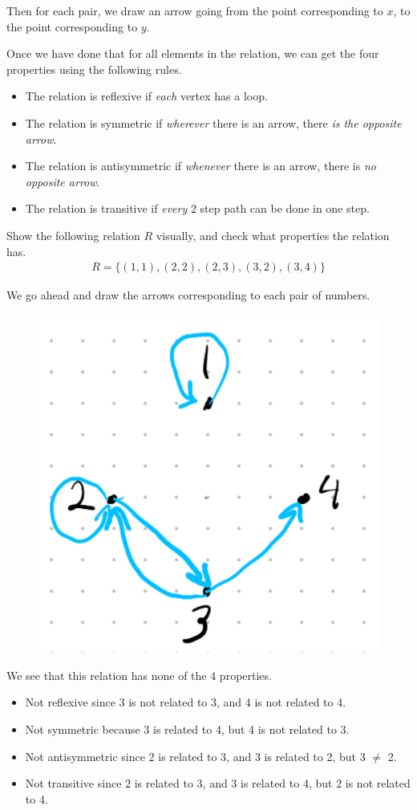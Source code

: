\documentclass[12pt,letterpaper]{article} \usepackage{amsmath} \usepackage{graphicx}  \usepackage{longtable}  \usepackage{amssymb}
\begin{document}
        Then for each pair, we draw an arrow going from the point corresponding to $x$, to the point corresponding to $y$. 

        Once we have done that for all elements in the relation, we can get the four properties using the following rules. 
        \begin{itemize}[noitemsep]
            \item The relation is reflexive if \emph{each} vertex has a loop.
            \item The relation is symmetric if \emph{wherever} there is an arrow, there \emph{is the opposite arrow}. 
            \item The relation is antisymmetric if \emph{whenever} there is an arrow, there is \emph{no opposite arrow}.
            \item The relation is transitive if \emph{every} 2 step path can be done in one step. 
        \end{itemize}

        \begin{mdframed}
            Show the following relation $R$ visually, and check what properties the relation has.
            \begin{align*}
                R = \{(1,1), (2,2), (2,3), (3,2), (3,4)\}
            \end{align*}   
            
            We go ahead and draw the arrows corresponding to each pair of numbers. 

            \begin{figure}[H]
                \centering
                \includegraphics[width=0.2\linewidth]{related_visual.png}
            \end{figure}

            We see that this relation has none of the 4 properties. 
            \begin{itemize}[noitemsep]
                \item Not reflexive since 3 is not related to 3, and 4 is not related to 4.
                \item Not symmetric because 3 is related to 4, but 4 is not related to 3. 
                \item Not antisymmetric since 2 is related to 3, and 3 is related to 2, but 3 $\ne$ 2. 
                \item Not transitive since 2 is related to 3, and 3 is related to 4, but 2 is not related to 4. 
            \end{itemize}
            
        \end{mdframed}
\end{document}
